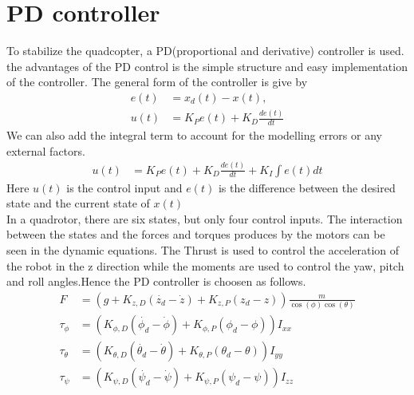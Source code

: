 \section{PD controller}
To stabilize the quadcopter, a PD(proportional and derivative) controller is used. the advantages of the PD control is the simple structure and easy implementation of the controller. The general form of the controller is give by
\begin{align*}
  e(t) & = x_d(t) -x(t),\\
  u(t) & = K_Pe(t) + K_D\frac{de(t)}{dt}
\end{align*}
We can also add the integral term to account for the modelling errors or any external factors.
\begin{align*}
  u(t) & = K_Pe(t) + K_D\frac{de(t)}{dt} +K_I \int e(t)dt
\end{align*}
Here $u(t)$ is the control input and $e(t)$ is the difference between the desired state and the current state of $x(t)$ \\

In a quadrotor, there are six states, but only four control inputs. The interaction between the states and the forces and torques produces by the motors can be seen in the dynamic equations. The Thrust is used to control the acceleration of the robot in the z direction while the moments are used to control the yaw, pitch and roll angles.Hence the PD controller is choosen as follows.
\begin{align*}
  F & = (g + K_{z,D}(\dot{z_d} - \dot{z}) + K_{z,P}(z_d -z))\frac{m}{\cos(\phi)\cos(\theta)}\\
  \tau_\phi & = ( K_{\phi,D}(\dot{\phi_d} - \dot{\phi}) + K_{\phi,P}(\phi_d - \phi) )I_{xx}\\
  \tau_\theta & = ( K_{\theta,D}(\dot{\theta_d} - \dot{\theta}) + K_{\theta,P}(\theta_d - \theta) )I_{yy}\\
  \tau_\psi & = ( K_{\psi,D}(\dot{\psi_d} - \dot{\psi}) + K_{\psi,P}(\psi_d - \psi) )I_{zz}\\
\end{align*}


